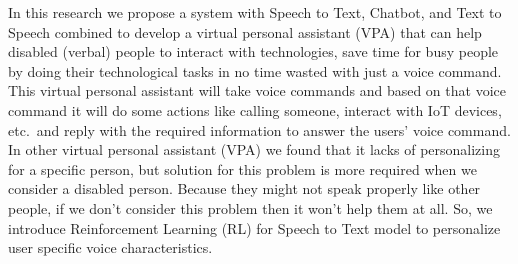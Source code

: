 In this research we propose a system with Speech to Text, Chatbot, and Text to Speech combined to develop a virtual personal assistant (VPA) that can help disabled (verbal) people to interact with technologies, save time for busy people by doing their technological tasks in no time wasted with just a voice command.
This virtual personal assistant will take voice commands and based on that voice command it will do some actions like calling someone, interact with IoT devices, etc.\ and reply with the required information to answer the users' voice command.
In other virtual personal assistant (VPA) we found that it lacks of personalizing for a specific person, but solution for this problem is more required when we consider a disabled person.
Because they might not speak properly like other people, if we don't consider this problem then it won't help them at all.
So, we introduce Reinforcement Learning (RL) for Speech to Text model to personalize user specific voice characteristics.

